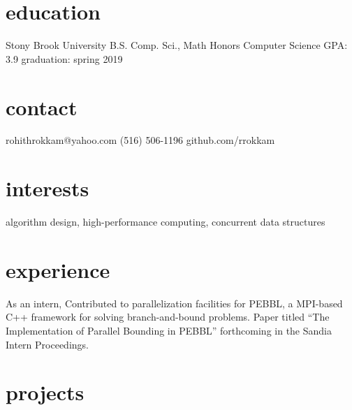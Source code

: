 \documentclass{cv}
\begin{document}

\begin{aside}
  \section{education}
    Stony Brook University
    B.S. Comp. Sci., Math
    Honors Computer Science
    GPA: 3.9
    graduation: spring 2019
  \section{contact}
    rohithrokkam@yahoo.com
    (516) 506-1196
    github.com/rrokkam
\end{aside}

\section{interests}

algorithm design, high-performance computing, concurrent data structures

\section{experience}

\begin{entrylist}
    {As an intern, Contributed to parallelization facilities for PEBBL, a MPI-based C++ framework for solving branch-and-bound problems. 
    Paper titled ``The Implementation of Parallel Bounding in PEBBL'' forthcoming in the Sandia Intern Proceedings.}
\end{entrylist}

\section{projects}
\end{document}
